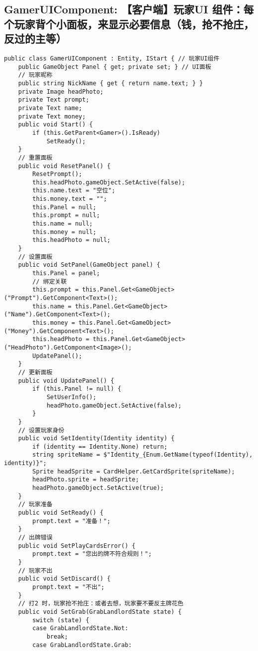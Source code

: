 \documentclass[9pt, b5paper]{article}
\begin{document}
\subsection{GamerUIComponent: 【客户端】玩家UI 组件：每个玩家背个小面板，来显示必要信息（钱，抢不抢庄，反过的主等）}
\label{sec-3-5}
\begin{verbatim}
public class GamerUIComponent : Entity, IStart { // 玩家UI组件
    public GameObject Panel { get; private set; } // UI面板
    // 玩家昵称
    public string NickName { get { return name.text; } }
    private Image headPhoto;
    private Text prompt;
    private Text name;
    private Text money;
    public void Start() {
        if (this.GetParent<Gamer>().IsReady) 
            SetReady();
    }
    // 重置面板
    public void ResetPanel() {
        ResetPrompt();
        this.headPhoto.gameObject.SetActive(false);
        this.name.text = "空位";
        this.money.text = "";
        this.Panel = null;
        this.prompt = null;
        this.name = null;
        this.money = null;
        this.headPhoto = null;
    }
    // 设置面板
    public void SetPanel(GameObject panel) {
        this.Panel = panel;
        // 绑定关联
        this.prompt = this.Panel.Get<GameObject>("Prompt").GetComponent<Text>();
        this.name = this.Panel.Get<GameObject>("Name").GetComponent<Text>();
        this.money = this.Panel.Get<GameObject>("Money").GetComponent<Text>();
        this.headPhoto = this.Panel.Get<GameObject>("HeadPhoto").GetComponent<Image>();
        UpdatePanel();
    }
    // 更新面板
    public void UpdatePanel() {
        if (this.Panel != null) {
            SetUserInfo();
            headPhoto.gameObject.SetActive(false);
        }
    }
    // 设置玩家身份
    public void SetIdentity(Identity identity) {
        if (identity == Identity.None) return;
        string spriteName = $"Identity_{Enum.GetName(typeof(Identity), identity)}";
        Sprite headSprite = CardHelper.GetCardSprite(spriteName);
        headPhoto.sprite = headSprite;
        headPhoto.gameObject.SetActive(true);
    }
    // 玩家准备
    public void SetReady() {
        prompt.text = "准备！";
    }
    // 出牌错误
    public void SetPlayCardsError() {
        prompt.text = "您出的牌不符合规则！";
    }
    // 玩家不出
    public void SetDiscard() {
        prompt.text = "不出";
    }
    // 打2 时，玩家抢不抢庄：或者去想，玩家要不要反主牌花色
    public void SetGrab(GrabLandlordState state) {
        switch (state) {
        case GrabLandlordState.Not:
            break;
        case GrabLandlordState.Grab:

\end{verbatim}
\end{document}
